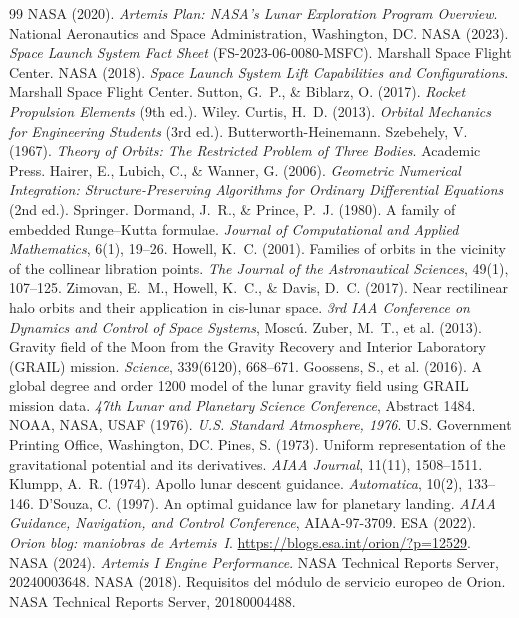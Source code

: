 \documentclass[11pt,a4paper]{article}
\begin{document}
\begin{thebibliography}{99}
 NASA (2020). \textit{Artemis Plan: NASA's Lunar Exploration Program Overview}. National Aeronautics and Space Administration, Washington, DC.
 NASA (2023). \textit{Space Launch System Fact Sheet} (FS-2023-06-0080-MSFC). Marshall Space Flight Center.
 NASA (2018). \textit{Space Launch System Lift Capabilities and Configurations}. Marshall Space Flight Center.
 Sutton, G.~P., \& Biblarz, O. (2017). \textit{Rocket Propulsion Elements} (9th ed.). Wiley.
 Curtis, H.~D. (2013). \textit{Orbital Mechanics for Engineering Students} (3rd ed.). Butterworth-Heinemann.
 Szebehely, V. (1967). \textit{Theory of Orbits: The Restricted Problem of Three Bodies}. Academic Press.
 Hairer, E., Lubich, C., \& Wanner, G. (2006). \textit{Geometric Numerical Integration: Structure-Preserving Algorithms for Ordinary Differential Equations} (2nd ed.). Springer.
 Dormand, J.~R., \& Prince, P.~J. (1980). A family of embedded Runge--Kutta formulae. \textit{Journal of Computational and Applied Mathematics}, 6(1), 19--26.
 Howell, K.~C. (2001). Families of orbits in the vicinity of the collinear libration points. \textit{The Journal of the Astronautical Sciences}, 49(1), 107--125.
 Zimovan, E.~M., Howell, K.~C., \& Davis, D.~C. (2017). Near rectilinear halo orbits and their application in cis-lunar space. \textit{3rd IAA Conference on Dynamics and Control of Space Systems}, Moscú.
 Zuber, M.~T., et al. (2013). Gravity field of the Moon from the Gravity Recovery and Interior Laboratory (GRAIL) mission. \textit{Science}, 339(6120), 668--671.
 Goossens, S., et al. (2016). A global degree and order 1200 model of the lunar gravity field using GRAIL mission data. \textit{47th Lunar and Planetary Science Conference}, Abstract 1484.
 NOAA, NASA, USAF (1976). \textit{U.S. Standard Atmosphere, 1976}. U.S. Government Printing Office, Washington, DC.
 Pines, S. (1973). Uniform representation of the gravitational potential and its derivatives. \textit{AIAA Journal}, 11(11), 1508--1511.
 Klumpp, A.~R. (1974). Apollo lunar descent guidance. \textit{Automatica}, 10(2), 133--146.
 D'Souza, C. (1997). An optimal guidance law for planetary landing. \textit{AIAA Guidance, Navigation, and Control Conference}, AIAA-97-3709.
 ESA (2022). \textit{Orion blog: maniobras de Artemis~I}. \url{https://blogs.esa.int/orion/?p=12529}.
 NASA (2024). \textit{Artemis I Engine Performance}. NASA Technical Reports Server, 20240003648.
 NASA (2018). Requisitos del módulo de servicio europeo de Orion. NASA Technical Reports Server, 20180004488.
\end{thebibliography}
\end{document}
